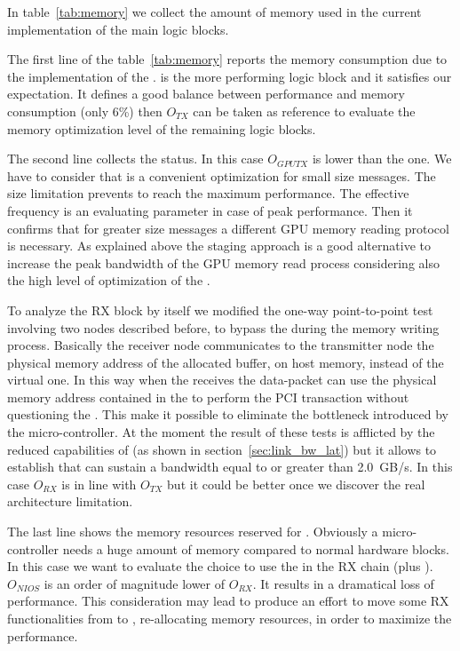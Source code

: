 In table~\ref{tab:memory} we collect the amount of memory used in the
current implementation of the main logic blocks.


The first line of the table~\ref{tab:memory} reports the memory
consumption due to the implementation of the .   is the more performing logic block and it satisfies our
expectation. It defines a good balance between performance and memory
consumption (only 6\%) then $O_{TX}$ can be taken as reference to
evaluate the memory optimization level of the remaining logic blocks.


The second line collects the  status. In this case
$O_{GPUTX}$ is lower than the  one.
We have to consider that \PtoP is a convenient optimization for small
size messages. The size limitation prevents to reach the maximum
performance. The effective frequency is an evaluating parameter in
case of peak performance. Then it confirms that for greater size
messages a different GPU memory reading protocol is necessary.
As explained above the staging approach is a good alternative to
increase the peak bandwidth of the GPU memory read process considering
also the high level of optimization of the .


To analyze the RX block by itself we modified the one-way
point-to-point test involving two nodes described before, to bypass
the \nios during the memory writing process.
Basically the receiver node communicates to the transmitter node the
physical memory address of the allocated buffer, on host memory,
instead of the virtual one. In this way when the 
receives the data-packet can use the physical memory address contained
in the \header to perform the PCI transaction without questioning the
\nios. This make it possible to eliminate the bottleneck introduced by
the \mbox{micro-controller}.
At the moment the result of these tests is afflicted by the reduced
capabilities of  (as shown in
section~\ref{sec:link_bw_lat}) but it allows to establish that  can sustain a bandwidth equal to or greater than 2.0~GB/s. In
this case $O_{RX}$ is in line with $O_{TX}$ but it could be better
once we discover the real architecture limitation.


The last line shows the memory resources reserved for \nios.
Obviously a \mbox{micro-controller} needs a huge amount of memory
compared to normal hardware blocks. In this case we want to evaluate
the choice to use the \nios in the RX chain (\nios plus ).  $O_{NIOS}$ is an order of magnitude lower of $O_{RX}$. It
results in a dramatical loss of performance. This consideration may
lead to produce an effort to move some RX functionalities from \nios
to , re-allocating memory resources, in order to maximize
the performance.

